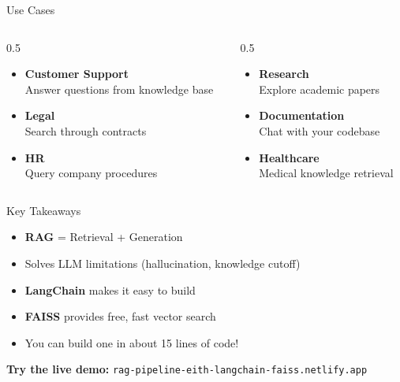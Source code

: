\documentclass[aspectratio=169]{beamer}
\begin{document}
\begin{frame}{Use Cases}
    \begin{columns}
        \begin{column}{0.5\textwidth}
            \begin{itemize}
                \item \textbf{Customer Support}\\Answer questions from knowledge base
                \item \textbf{Legal}\\Search through contracts
                \item \textbf{HR}\\Query company procedures
            \end{itemize}
        \end{column}
        \begin{column}{0.5\textwidth}
            \begin{itemize}
                \item \textbf{Research}\\Explore academic papers
                \item \textbf{Documentation}\\Chat with your codebase
                \item \textbf{Healthcare}\\Medical knowledge retrieval
            \end{itemize}
        \end{column}
    \end{columns}
\end{frame}

\begin{frame}{Key Takeaways}
    \begin{itemize}
        \item[\textcolor{green}{$\checkmark$}] \textbf{RAG} = Retrieval + Generation
        \item[\textcolor{green}{$\checkmark$}] Solves LLM limitations (hallucination, knowledge cutoff)
        \item[\textcolor{green}{$\checkmark$}] \textbf{LangChain} makes it easy to build
        \item[\textcolor{green}{$\checkmark$}] \textbf{FAISS} provides free, fast vector search
        \item[\textcolor{green}{$\checkmark$}] You can build one in about 15 lines of code!
    \end{itemize}

    \vspace{1em}

    \begin{tcolorbox}[colback=ragpurple!10, colframe=ragpurple]
        \centering
        \textbf{Try the live demo:} \texttt{rag-pipeline-eith-langchain-faiss.netlify.app}
    \end{tcolorbox}
\end{frame}
\end{document}
